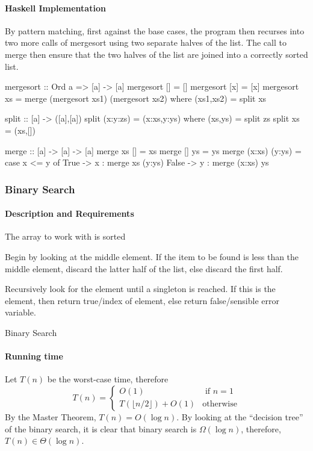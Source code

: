 \documentclass[10pt]{article}
\begin{document}
\paragraph{Haskell Implementation}
By pattern matching, first against the base cases, the program then recurses into two more calls of mergesort using two separate halves of the list.  The call to merge then ensure that the two halves of the list are joined into a correctly sorted list.
\begin{code}
mergesort :: Ord a => [a] -> [a]
mergesort [] = []
mergesort [x] = [x]
mergesort xs = merge (mergesort xs1) (mergesort xs2)
	where (xs1,xs2) = split xs

split :: [a] -> ([a],[a])
split (x:y:zs) = (x:xs,y:ys) where (xs,ys) = split zs
split xs = (xs,[])

merge :: [a] -> [a] -> [a]
merge xs [] = xs
merge [] ys = ys
merge (x:xs) (y:ys) = 
  case x <= y of
	True -> x : merge xs (y:ys)
	False -> y : merge (x:xs) ys
\end{code}
\subsubsection{Binary Search}
\paragraph{Description and Requirements}
\begin{itemize*}
\item The array to work with is sorted
\item Begin by looking at the middle element.  If the item to be found is less than the middle element, discard the latter half of the list, else discard the first half.
\item Recursively look for the element until a singleton is reached.  If this is the element, then return true/index of element, else return false/sensible error variable.
\end{itemize*}
\begin{algorithm}
\caption{Binary Search}
\end{algorithm}
\paragraph{Running time}Let $T(n)$ be the worst-case time, therefore \[T(n)=\begin{cases}O(1)&\text{ if }n=1\\T\left(\lfloor n/2\rfloor\right)+O(1)&\text{otherwise}\end{cases}\] By the Master Theorem, $T(n)=O(\log n)$.  By looking at the ``decision tree'' of the binary search, it is clear that binary search is $\Omega(\log n)$, therefore, $T(n)\in\Theta(\log n)$.
\end{document}
